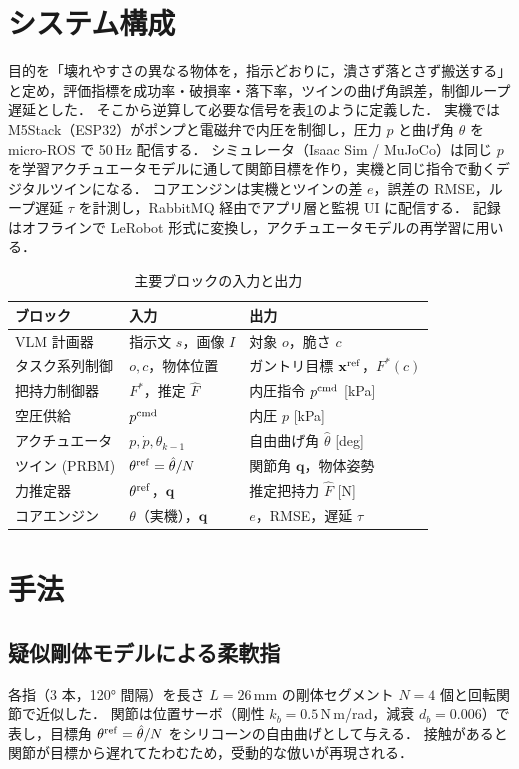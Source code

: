 \documentclass[a4paper,twocolumn,10pt]{ltjsarticle}
\begin{document}
\section{システム構成}
目的を「壊れやすさの異なる物体を，指示どおりに，潰さず落とさず搬送する」と定め，評価指標を成功率・破損率・落下率，ツインの曲げ角誤差，制御ループ遅延とした．
そこから逆算して必要な信号を表\ref{tab:io}のように定義した．
実機では M5Stack（ESP32）がポンプと電磁弁で内圧を制御し，圧力 $p$ と曲げ角 $\theta$ を micro-ROS で 50\,Hz 配信する．
シミュレータ（Isaac Sim / MuJoCo）は同じ $p$ を学習アクチュエータモデルに通して関節目標を作り，実機と同じ指令で動くデジタルツインになる．
コアエンジンは実機とツインの差 $e$，誤差の RMSE，ループ遅延 $\tau$ を計測し，RabbitMQ 経由でアプリ層と監視 UI に配信する．
記録はオフラインで LeRobot 形式に変換し，アクチュエータモデルの再学習に用いる．

\begin{table}[t]
\centering\small
\caption{主要ブロックの入力と出力}
\label{tab:io}
\begin{tabular}{@{}p{22mm}p{24mm}p{25mm}@{}}
\toprule
ブロック & 入力 & 出力 \\
\midrule
VLM 計画器 & 指示文 $s$，画像 $I$ & 対象 $o$，脆さ $c$ \\
タスク系列制御 & $o,c$，物体位置 & ガントリ目標 $\mathbf{x}^{\rm ref}$，$F^*(c)$ \\
把持力制御器 & $F^*$，推定 $\hat F$ & 内圧指令 $p^{\rm cmd}$ [kPa] \\
空圧供給 & $p^{\rm cmd}$ & 内圧 $p$ [kPa] \\
アクチュエータ & $p,\dot p,\hat\theta_{k-1}$ & 自由曲げ角 $\hat\theta$ [deg] \\
ツイン (PRBM) & $\theta^{\rm ref}=\hat\theta/N$ & 関節角 $\mathbf q$，物体姿勢 \\
力推定器 & $\theta^{\rm ref}$，$\mathbf q$ & 推定把持力 $\hat F$ [N] \\
コアエンジン & $\theta$（実機），$\mathbf q$ & $e$，RMSE，遅延 $\tau$ \\
\bottomrule
\end{tabular}
\end{table}

\section{手法}
\subsection{疑似剛体モデルによる柔軟指}
各指（3 本，120° 間隔）を長さ $L=26$\,mm の剛体セグメント $N=4$ 個と回転関節で近似した．
関節は位置サーボ（剛性 $k_b=0.5$\,N\,m/rad，減衰 $d_b=0.006$）で表し，目標角 $\theta^{\rm ref}=\hat\theta/N$ をシリコーンの自由曲げとして与える．
接触があると関節が目標から遅れてたわむため，受動的な倣いが再現される．
\end{document}
